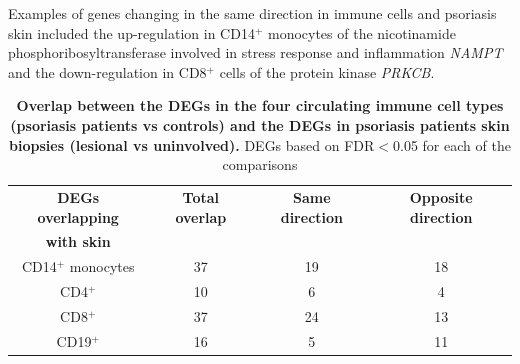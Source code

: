 Examples of genes changing in the same direction in immune cells and psoriasis skin included the up-regulation in CD14$^+$ monocytes of the nicotinamide phosphoribosyltransferase involved in stress response and inflammation \textit{NAMPT} \parencite{Presumey2013} and the down-regulation in CD8$^+$ cells of the protein kinase \textit{PRKCB}.
 

\begin{table}[htbp]
\centering
\begin{tabular}{@{} c c c c}
\toprule
\textbf{DEGs overlapping}   & \textbf{Total overlap}   & \textbf{Same direction}  & \textbf{Opposite direction}\\
\textbf{with skin}          &                          &                          &                            \\
\midrule 
\midrule
CD14$^+$ monocytes          & 37                       & 19                       &  18                         \\ 
CD4$^+$                     & 10                       & 6                        &  4                           \\
CD8$^+$                     & 37                       & 24                       &  13                           \\
CD19$^+$                    & 16                       & 5                        &  11                          \\
\bottomrule 
\end{tabular}
\medskip %
\caption[Overlap between the DEGs in the four circulating immune cell types (psoriasis patients vs controls) and the DEGs in psoriasis patients skin biopsies (lesional vs uninvolved).]{\textbf{Overlap between the DEGs in the four circulating immune cell types (psoriasis patients vs controls) and the DEGs in psoriasis patients skin biopsies (lesional vs uninvolved).} DEGs based on FDR$<$0.05 for each of the comparisons} 
\label{tab:RNAseq_overlap_circulating_versus_skin}
\end{table}
\bigskip %


